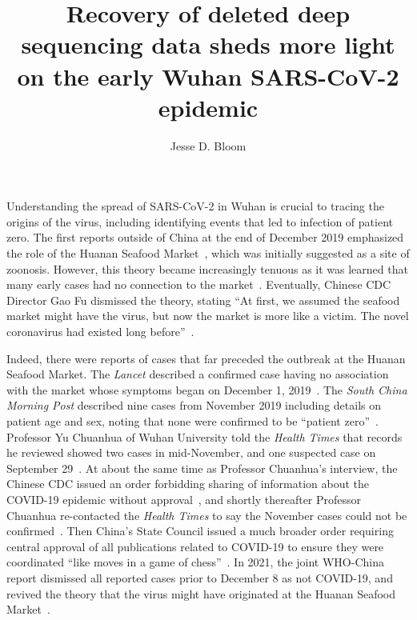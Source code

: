 \documentclass[9pt,twocolumn,twoside]{gsajnl_modified}
\title{Recovery of deleted deep sequencing data sheds more light on the early Wuhan SARS-CoV-2 epidemic}
\author[]{\Large Jesse D. Bloom}
\affil[]{Fred Hutchinson Cancer Research Center}
\affil[]{Howard Hughes Medical Institute}
\affil[]{Seattle, WA, USA}
\begin{document}
\maketitle
\thispagestyle{firststyle}
\firstpagefootnote

\vspace{-33pt}%

\lettrine[lines=2]{\color{color2}U}{}nderstanding the spread of SARS-CoV-2 in Wuhan is crucial to tracing the origins of the virus, including identifying events that led to infection of patient zero.
The first reports outside of China at the end of December 2019 emphasized the role of the Huanan Seafood Market~\citep{ProMED2109}, which was initially suggested as a site of zoonosis.
However, this theory became increasingly tenuous as it was learned that many early cases had no connection to the market~\citep{cohen2020wuhan,huang2020clinical, chen2020epidemiological}.
Eventually, Chinese CDC Director Gao Fu dismissed the theory, stating ``At first, we assumed the seafood market might have the virus, but now the market is more like a victim.
The novel coronavirus had existed long before''~\citep{GlobalTimes2020}.

Indeed, there were reports of cases that far preceded the outbreak at the Huanan Seafood Market.
The \textit{Lancet} described a confirmed case having no association with the market whose symptoms began on December 1, 2019~\citep{huang2020clinical}.
The \textit{South China Morning Post} described nine cases from November 2019 including details on patient age and sex, noting that none were confirmed to be ``patient zero''~\citep{ma2020SCMP}.
Professor Yu Chuanhua of Wuhan University told the \textit{Health Times} that records he reviewed showed two cases in mid-November, and one suspected case on September 29~\citep{healthtimes2020}.
At about the same time as Professor Chuanhua's interview, the Chinese CDC issued an order forbidding sharing of information about the COVID-19 epidemic without approval~\citep{chinacdc2020}, and shortly thereafter Professor Chuanhua re-contacted the \textit{Health Times} to say the November cases could not be confirmed~\citep{healthtimes2020}.
Then China's State Council issued a much broader order requiring central approval of all publications related to COVID-19 to ensure they were coordinated ``like moves in a game of chess''~\citep{Kang2020}.
In 2021, the joint WHO-China report dismissed all reported cases prior to December 8 as not COVID-19, and revived the theory that the virus might have originated at the Huanan Seafood Market~\citep{WHO2021origins}.
\end{document}

